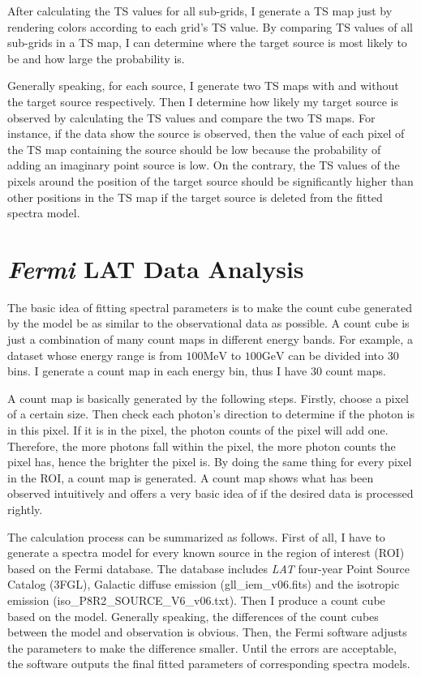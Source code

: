 \documentclass[a4paper, 12pt]{report}
\begin{document}
      After calculating the TS values for all sub-grids, I generate a TS map just by 
      rendering colors according to each grid's TS value. By comparing TS values of 
      all sub-grids in a TS map, I can determine where the target source is most likely to 
      be and how large the probability is. 
      
      Generally speaking, for each source, I generate two TS maps with and without the 
      target source respectively. Then I determine how likely my target source is observed 
      by calculating the TS values and compare the two TS maps. 
      For instance, if the data show the source is observed, 
      then the value of each pixel of the TS map containing the source should be low because 
      the probability of adding an imaginary point source is low. 
      On the contrary, the TS values of the pixels around the position of the target 
      source should be significantly higher than other positions in the TS map if the target 
      source is deleted from the fitted spectra model.
       
  \section{\textit{Fermi} LAT Data Analysis}
    The basic idea of fitting spectral parameters is to make the count cube generated by 
    the model be as similar to the observational data as possible. A count cube is just a 
    combination of many count maps in different energy bands. For example, a dataset whose 
    energy range is from $100\mbox{MeV}$ to $100\mbox{GeV}$ can be divided into 30 bins. 
    I generate a count map in each energy bin, thus I have 30 count maps.
    
    A count map is basically generated by the following steps. Firstly, choose a 
    pixel of a certain size. Then check each photon's direction to determine if 
    the photon is in this pixel. If it is in the pixel, the photon counts of the 
    pixel will add one. Therefore, the more photons fall within the pixel, the more 
    photon counts the pixel has, hence the brighter the pixel is. By doing the same 
    thing for every pixel in the ROI, a count map is generated. A count map shows 
    what has been observed intuitively and offers a very basic idea of if 
    the desired data is processed rightly.
          
    The calculation process can be summarized as follows. First of all, I have to generate 
    a spectra model for every known source in the region of interest (ROI) based on the Fermi 
    database. The database includes \textit{LAT} four-year Point Source Catalog (3FGL), 
    Galactic diffuse emission (gll\_iem\_v06.fits) and the isotropic emission 
    (iso\_P8R2\_SOURCE\_V6\_v06.txt). Then I produce a count cube based on the 
    model. Generally speaking, the differences of the count cubes between the model and 
    observation is obvious. Then, the Fermi software adjusts the parameters 
    to make the difference smaller. Until the errors are acceptable, the software 
    outputs the final fitted parameters of corresponding spectra models.    
\end{document}
